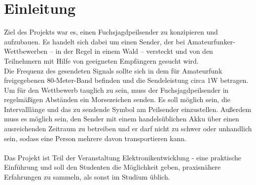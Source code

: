 \section{Einleitung}
Ziel des Projekts war es, einen \glqq{}Fuchsjagdpeilsender\grqq{} zu konzipieren und aufzubauen.
Es handelt sich dabei um einen Sender, der bei Amateurfunker-Wettbewerben -- in der Regel in einem
Wald -- versteckt und von den Teilnehmern mit Hilfe von geeigneten Empfängern gesucht wird.\\
Die Frequenz des gesendeten Signals sollte sich in dem für Amateurfunk freigegebenen
80-Meter-Band befinden und die Sendeleistung circa 1W betragen. Um für den Wettbewerb
tauglich zu sein, muss der Fuchsjagdpeilsender in regelmäßigen Abständen ein Morsezeichen senden.
Es soll möglich sein, die Intervalllänge und das zu sendende Symbol am Peilsender einzustellen.
Außerdem muss es möglich sein, den Sender mit einem handelsüblichen Akku über einen 
ausreichenden Zeitraum zu betreiben und er darf nicht zu schwer oder unhandlich sein, sodass eine
Person mehrere davon transportieren kann. \\\\
Das Projekt ist Teil der Veranstaltung \glqq{}Elektronikentwicklung - eine praktische 
Einführung\grqq{} und soll den Studenten die Möglichkeit geben, praxisnähere Erfahrungen zu sammeln,
als sonst im Studium üblich.
